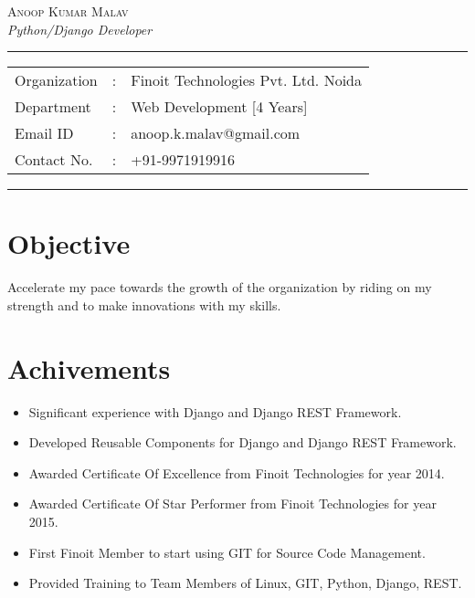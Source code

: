 \documentclass[11pt]{article}
\begin{document}
\begin{center}

\textsc{\Large Anoop Kumar Malav}
 \\[0.1cm]

\textit{\large Python/Django Developer} \\
\addvspace{0.04cm}
\rule[0.07cm]{17.52cm}{0.01cm}
\begin{tabular}{l c l}
Organization      &:& Finoit Technologies Pvt. Ltd. Noida \\
Department        &:& Web Development [4 Years]\\
Email ID          &:& anoop.k.malav@gmail.com \\
Contact No.       &:& +91-9971919916 \\
\end{tabular}

\addvspace{0.02cm}
\rule[0.02cm]{17.52cm}{0.01cm}
\end{center}

\section*{Objective}
Accelerate my pace towards the growth of the organization by riding on my strength and
to make innovations with my skills.

\section*{Achivements}

\begin{itemize}
 \item Significant experience with Django and Django REST Framework.
 \item Developed Reusable Components for Django and Django REST Framework.
 \item Awarded Certificate Of Excellence from Finoit Technologies for year 2014.
 \item Awarded Certificate Of Star Performer from Finoit Technologies for year 2015.
 \item First Finoit Member to start using GIT for Source Code Management.
 \item Provided Training to Team Members of Linux, GIT, Python, Django, REST.
\end{itemize}
\end{document}
